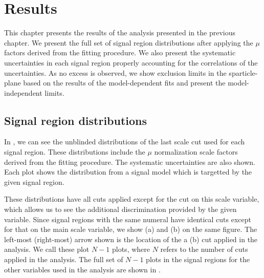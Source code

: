 

\chapter[Results][Results]{Results}

This chapter presents the results of the analysis presented in the previous chapter.
We present the full set of signal region distributions after applying the $\mu$ factors derived from the fitting procedure.
We also present the systematic uncertainties in each signal region properly accounting for the correlations of the uncertainties.
As no excess is observed, we show exclusion limits in the sparticle-\lsp~ plane based on the results of the model-dependent fits and present the model-independent limits.

\section{Signal region distributions}



In , we can see the unblinded distributions of the last scale cut used for each signal region.
These distributions include the $\mu$ normalization scale factors derived from the fitting procedure.
The systematic uncertainties are also shown.
Each plot shows the distribution from a signal model which is targetted by the given signal region.

These distributions have all cuts applied except for the cut on this scale variable, which allows us to see the additional discrimination provided by the given variable.
Since signal regions with the same numeral have identical cuts except for that on the main scale variable, we show (a) and (b) on the same figure.
The left-most (right-most) arrow shown is the location of the a (b) cut applied in the analysis.
We call these plot \textit{$N-1$} plots, where $N$ refers to the number of cuts applied in the analysis.
The full set of $N-1$ plots in the signal regions for the other variables used in the analysis are shown in .

